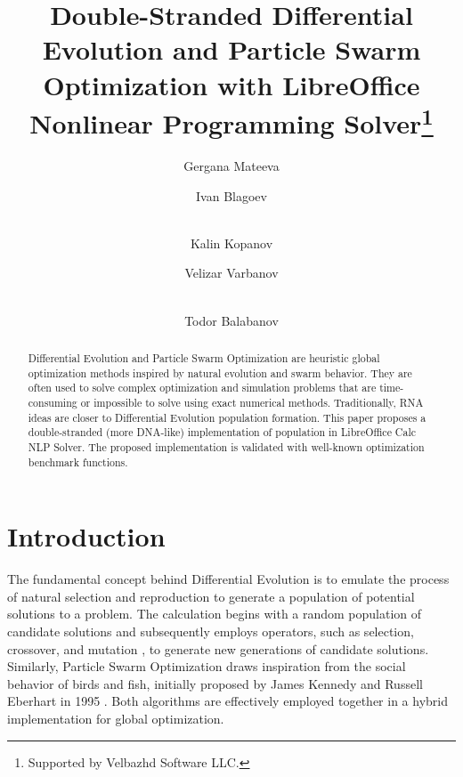 \documentclass[runningheads]{llncs}
\begin{document}
\title{Double-Stranded Differential Evolution and Particle Swarm Optimization with LibreOffice Nonlinear Programming Solver\thanks{Supported by Velbazhd Software LLC.}}


\author{
Gergana Mateeva \and
Ivan Blagoev \and\\
Kalin Kopanov \and
Velizar Varbanov \and\\
Todor Balabanov
}



\maketitle

\begin{abstract}
Differential Evolution and Particle Swarm Optimization are heuristic global optimization methods inspired by natural evolution and swarm behavior. They are often used to solve complex optimization and simulation problems that are time-consuming or impossible to solve using exact numerical methods. Traditionally, RNA ideas are closer to Differential Evolution population formation. This paper proposes a double-stranded (more DNA-like) implementation of population in LibreOffice Calc NLP Solver. The proposed implementation is validated with well-known optimization benchmark functions.

\end{abstract}

\section{Introduction}

The fundamental concept behind Differential Evolution is to emulate the process of natural selection and reproduction to generate a population of potential solutions to a problem. The calculation begins with a random population of candidate solutions and subsequently employs operators, such as selection, crossover, and mutation \cite{Lambora-2019}, to generate new generations of candidate solutions. Similarly, Particle Swarm Optimization draws inspiration from the social behavior of birds and fish, initially proposed by James Kennedy and Russell Eberhart in 1995 \cite{Kennedy-1995}. Both algorithms are effectively employed together in a hybrid implementation for global optimization.
\end{document}
